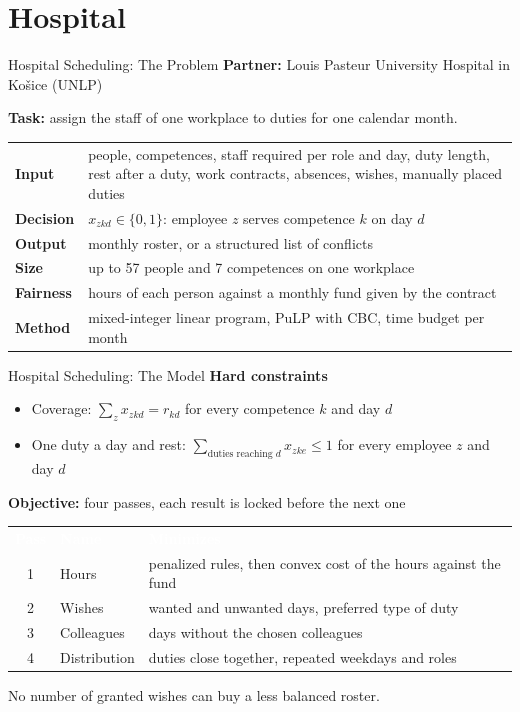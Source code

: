 \documentclass[aspectratio=43,xcolor={svgnames,table},t]{beamer}
\newcommand{\head}[1]{\textcolor{white}{\bfseries #1}}
\newcommand{\rowhead}[1]{\textcolor{myuniversity}{\bfseries #1}}
\begin{document}
\section{Hospital}

\begin{frame}{Hospital Scheduling: The Problem}
  \textbf{Partner:} Louis Pasteur University Hospital in Košice (UNLP)

  \medskip
  \textbf{Task:} assign the staff of one workplace to duties for one calendar month.

  \medskip
  \centering
  \footnotesize
  \begin{tabular}{@{}L{0.2\textwidth}L{0.74\textwidth}@{}}
    \rowhead{Input} & people, competences, staff required per role and day, duty length, rest after a duty, work contracts, absences, wishes, manually placed duties\\
    \rowhead{Decision} & $x_{zkd} \in \{0,1\}$: employee $z$ serves competence $k$ on day $d$\\
    \rowhead{Output} & monthly roster, or a structured list of conflicts\\
    \rowhead{Size} & up to 57 people and 7 competences on one workplace\\
    \rowhead{Fairness} & hours of each person against a monthly fund given by the contract\\
    \rowhead{Method} & mixed-integer linear program, PuLP with CBC, time budget per month\\
    \bottomrule
  \end{tabular}
\end{frame}

\begin{frame}{Hospital Scheduling: The Model}
  \textbf{Hard constraints}
  \begin{itemize}
    \item Coverage: $\sum_z x_{zkd} = r_{kd}$ for every competence $k$ and day $d$
    \item One duty a day and rest: $\sum_{\text{duties reaching } d} x_{zke} \leq 1$ for every employee $z$ and day $d$
  \end{itemize}

  \medskip
  \textbf{Objective:} four passes, each result is locked before the next one
  \begin{center}
    \footnotesize
    \begin{tabular}{@{}clL{0.58\textwidth}@{}}
      \head{Pass} & \head{Name} & \head{Minimizes}\\
      1 & Hours & penalized rules, then convex cost of the hours against the fund\\
      2 & Wishes & wanted and unwanted days, preferred type of duty\\
      3 & Colleagues & days without the chosen colleagues\\
      4 & Distribution & duties close together, repeated weekdays and roles\\
      \bottomrule
    \end{tabular}
  \end{center}
  No number of granted wishes can buy a less balanced roster.
\end{frame}
\end{document}
